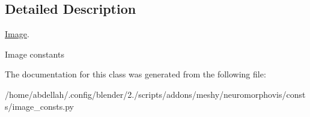 \subsection{Detailed Description}
\hyperlink{classmeshy_1_1neuromorphovis_1_1consts_1_1image__consts_1_1Image}{Image}. 

\begin{DoxyVerb}Image constants
\end{DoxyVerb}
 

The documentation for this class was generated from the following file\+:\begin{DoxyCompactItemize}
\item 
/home/abdellah/.\+config/blender/2./scripts/addons/meshy/neuromorphovis/consts/image\+\_\+consts.\+py\end{DoxyCompactItemize}
